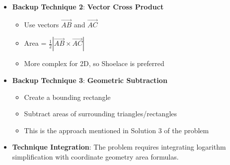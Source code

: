 \documentclass[12pt]{article}
\begin{document}
\begin{techniquesbox}
\begin{itemize}[leftmargin=*]
    \item \textbf{Backup Technique 2}: \textbf{Vector Cross Product}
    \begin{itemize}
        \item Use vectors $\vec{AB}$ and $\vec{AC}$
        \item Area = $\frac{1}{2}|\vec{AB} \times \vec{AC}|$
        \item More complex for 2D, so Shoelace is preferred
    \end{itemize}
    
    \item \textbf{Backup Technique 3}: \textbf{Geometric Subtraction}
    \begin{itemize}
        \item Create a bounding rectangle
        \item Subtract areas of surrounding triangles/rectangles
        \item This is the approach mentioned in Solution 3 of the problem
    \end{itemize}
    
    \item \textbf{Technique Integration}: The problem requires integrating logarithm simplification with coordinate geometry area formulas.
\end{itemize}
\end{techniquesbox}
\end{document}
